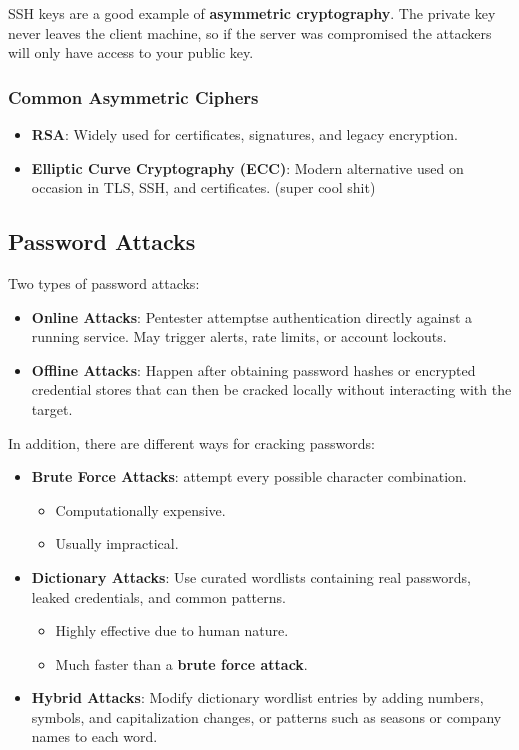 \documentclass[12pt, letterpaper]{article}
\begin{document}
\bigskip

SSH keys are a good example of \textbf{asymmetric cryptography}. The private key never leaves the client machine, so if the server was compromised the attackers will only have access to your public key.

\subsubsection*{Common Asymmetric Ciphers}

\begin{itemize}
    \item \textbf{RSA}: Widely used for certificates, signatures, and legacy encryption.
    \item \textbf{Elliptic Curve Cryptography (ECC)}: Modern alternative used on occasion in TLS, SSH, and certificates. (super cool shit)
\end{itemize}

\subsection*{Password Attacks}

Two types of password attacks:

\begin{itemize}
    \item \textbf{Online Attacks}: Pentester attemptse authentication directly against a running service. May trigger alerts, rate limits, or account lockouts.
    \item \textbf{Offline Attacks}: Happen after obtaining password hashes or encrypted credential stores that can then be cracked locally without interacting with the target.
\end{itemize}

\bigskip

In addition, there are different ways for cracking passwords:

\begin{itemize}
    \item \textbf{Brute Force Attacks}: attempt every possible character combination.
        \begin{itemize}
            \item Computationally expensive.
            \item Usually impractical.
        \end{itemize}
    \item \textbf{Dictionary Attacks}: Use curated wordlists containing real passwords, leaked credentials, and common patterns.
        \begin{itemize}
            \item Highly effective due to human nature.
            \item Much faster than a \textbf{brute force attack}.
        \end{itemize}
    \item \textbf{Hybrid Attacks}: Modify dictionary wordlist entries by adding numbers, symbols, and capitalization changes, or patterns such as seasons or company names to each word.
\end{itemize}
\end{document}
